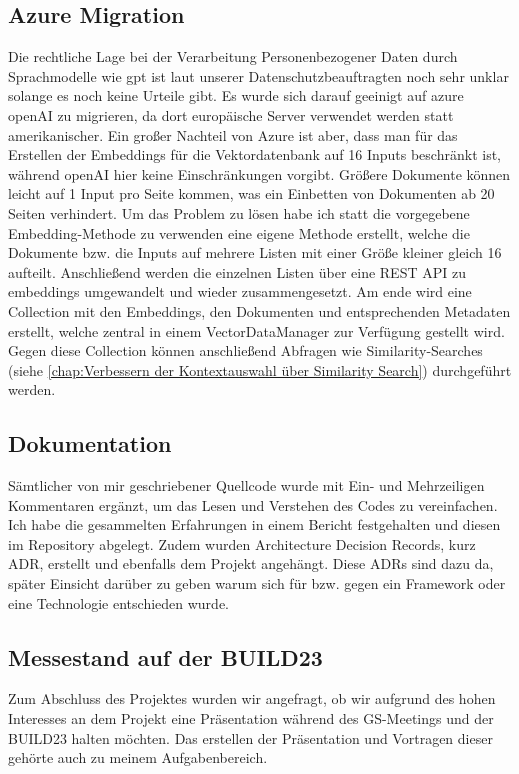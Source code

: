 \subsection{Azure Migration}
Die rechtliche Lage bei der Verarbeitung Personenbezogener Daten durch Sprachmodelle wie gpt ist laut unserer
Datenschutzbeauftragten noch sehr unklar solange es noch keine Urteile gibt. Es wurde sich darauf geeinigt auf azure
openAI zu migrieren, da dort europäische Server verwendet werden statt amerikanischer. Ein großer Nachteil von Azure ist
aber, dass man für das Erstellen der Embeddings für die Vektordatenbank auf 16 Inputs beschränkt ist, während openAI
hier keine Einschränkungen vorgibt. Größere Dokumente können leicht auf 1 Input pro Seite kommen, was ein Einbetten von
Dokumenten ab 20 Seiten verhindert. Um das Problem zu lösen habe ich statt die vorgegebene Embedding-Methode zu
verwenden eine eigene Methode erstellt, welche die Dokumente bzw. die Inputs auf mehrere Listen mit einer Größe kleiner
gleich 16 aufteilt. Anschließend werden die einzelnen Listen über eine REST API zu embeddings umgewandelt und wieder
zusammengesetzt. Am ende wird eine Collection mit den Embeddings, den Dokumenten und entsprechenden Metadaten erstellt,
welche zentral in einem VectorDataManager zur Verfügung gestellt wird. Gegen diese Collection können anschließend
Abfragen wie Similarity-Searches (siehe \ref{chap:Verbessern der Kontextauswahl über Similarity Search}) durchgeführt
werden.

\subsection{Dokumentation}
Sämtlicher von mir geschriebener Quellcode wurde mit Ein- und Mehrzeiligen Kommentaren ergänzt, um das Lesen und
Verstehen des Codes zu vereinfachen. Ich habe die gesammelten Erfahrungen in einem Bericht festgehalten und diesen im
Repository abgelegt. Zudem wurden Architecture Decision Records, kurz ADR, erstellt und ebenfalls dem Projekt angehängt.
Diese ADRs sind dazu da, später Einsicht darüber zu geben warum sich für bzw. gegen ein Framework oder eine Technologie
entschieden wurde.

\subsection{Messestand auf der BUILD23}

Zum Abschluss des Projektes wurden wir angefragt, ob wir aufgrund des hohen Interesses an dem Projekt eine Präsentation
während des GS-Meetings und der BUILD23 halten möchten. Das erstellen der Präsentation und Vortragen dieser gehörte auch
zu meinem Aufgabenbereich.


